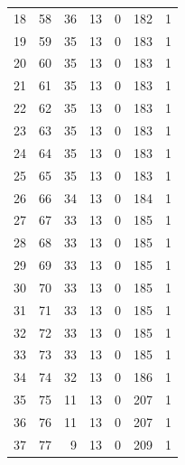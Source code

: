 \documentclass[a4paper,twoside,12pt]{book}
\begin{document}
\begin{appendices}
\begin{table}
\begin{tabular}{lrrrrrr}
		18  &     58 &        36 &        13 &               0 &             182 &         1 \\
		19  &     59 &        35 &        13 &               0 &             183 &         1 \\
		20  &     60 &        35 &        13 &               0 &             183 &         1 \\
		21  &     61 &        35 &        13 &               0 &             183 &         1 \\
		22  &     62 &        35 &        13 &               0 &             183 &         1 \\
		23  &     63 &        35 &        13 &               0 &             183 &         1 \\
		24  &     64 &        35 &        13 &               0 &             183 &         1 \\
		25  &     65 &        35 &        13 &               0 &             183 &         1 \\
		26  &     66 &        34 &        13 &               0 &             184 &         1 \\
		27  &     67 &        33 &        13 &               0 &             185 &         1 \\
		28  &     68 &        33 &        13 &               0 &             185 &         1 \\
		29  &     69 &        33 &        13 &               0 &             185 &         1 \\
		30  &     70 &        33 &        13 &               0 &             185 &         1 \\
		31  &     71 &        33 &        13 &               0 &             185 &         1 \\
		32  &     72 &        33 &        13 &               0 &             185 &         1 \\
		33  &     73 &        33 &        13 &               0 &             185 &         1 \\
		34  &     74 &        32 &        13 &               0 &             186 &         1 \\
		35  &     75 &        11 &        13 &               0 &             207 &         1 \\
		36  &     76 &        11 &        13 &               0 &             207 &         1 \\
		37  &     77 &         9 &        13 &               0 &             209 &         1 \\

\end{tabular}
\end{table}
\end{appendices}
\end{document}
